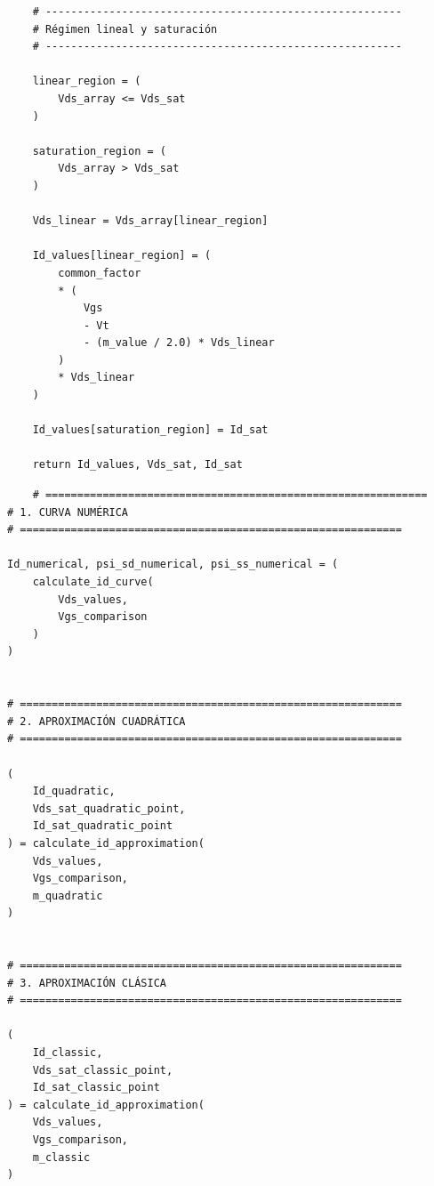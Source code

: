 \documentclass[a4paper, twoside, 10pt, spanish]{article}
\numberwithin{table}{section}
\begin{document}
\begin{verbatim}
    # --------------------------------------------------------
    # Régimen lineal y saturación
    # --------------------------------------------------------

    linear_region = (
        Vds_array <= Vds_sat
    )

    saturation_region = (
        Vds_array > Vds_sat
    )

    Vds_linear = Vds_array[linear_region]

    Id_values[linear_region] = (
        common_factor
        * (
            Vgs
            - Vt
            - (m_value / 2.0) * Vds_linear
        )
        * Vds_linear
    )

    Id_values[saturation_region] = Id_sat

    return Id_values, Vds_sat, Id_sat
\end{verbatim}

\begin{verbatim}
    # ============================================================
# 1. CURVA NUMÉRICA
# ============================================================

Id_numerical, psi_sd_numerical, psi_ss_numerical = (
    calculate_id_curve(
        Vds_values,
        Vgs_comparison
    )
)


# ============================================================
# 2. APROXIMACIÓN CUADRÁTICA
# ============================================================

(
    Id_quadratic,
    Vds_sat_quadratic_point,
    Id_sat_quadratic_point
) = calculate_id_approximation(
    Vds_values,
    Vgs_comparison,
    m_quadratic
)


# ============================================================
# 3. APROXIMACIÓN CLÁSICA
# ============================================================

(
    Id_classic,
    Vds_sat_classic_point,
    Id_sat_classic_point
) = calculate_id_approximation(
    Vds_values,
    Vgs_comparison,
    m_classic
)
\end{verbatim}
\end{document}
